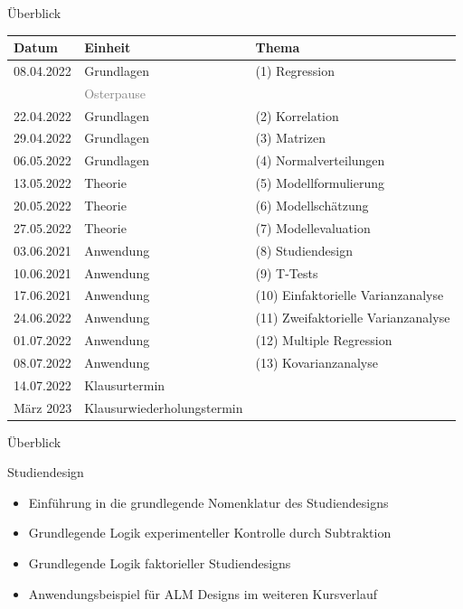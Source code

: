 \documentclass[
  8pt,
  ignorenonframetext,
]{beamer}
\begin{document}
\begin{frame}{Überblick}
\protect\hypertarget{uxfcberblick}{}
\small
\center
\footnotesize
\renewcommand{\arraystretch}{1.1}
\begin{tabular}{lll}
Datum        & Einheit                       & Thema                                              \\\hline
08.04.2022   & Grundlagen                    & (1) Regression                                 \\
             & \textcolor{gray}{Osterpause}                                             \\
22.04.2022   & Grundlagen                    & (2) Korrelation                            \\
29.04.2022   & Grundlagen                    & (3) Matrizen                             \\
06.05.2022   & Grundlagen                    & (4) Normalverteilungen                   \\
13.05.2022   & Theorie                       & (5) Modellformulierung                   \\
20.05.2022   & Theorie                       & (6) Modellschätzung                      \\
27.05.2022   & Theorie                       & (7) Modellevaluation                     \\
03.06.2021   & Anwendung                     & (8) Studiendesign                        \\
10.06.2021   & Anwendung                     & (9) T-Tests                              \\
17.06.2021   & Anwendung                     & (10) Einfaktorielle Varianzanalyse       \\
24.06.2022   & Anwendung                     & (11) Zweifaktorielle Varianzanalyse      \\
01.07.2022   & Anwendung                     & (12) Multiple Regression                 \\
08.07.2022   & Anwendung                     & (13) Kovarianzanalyse                    \\\hline
14.07.2022   & Klausurtermin                 &                                          \\
März 2023    & Klausurwiederholungstermin    &
\end{tabular}
\end{frame}

\begin{frame}{Überblick}
\protect\hypertarget{uxfcberblick-1}{}

Studiendesign

\begin{itemize}
\item
  Einführung in die grundlegende Nomenklatur des Studiendesigns
\item
  Grundlegende Logik experimenteller Kontrolle durch Subtraktion
\item
  Grundlegende Logik faktorieller Studiendesigns
\item
  Anwendungsbeispiel für ALM Designs im weiteren Kursverlauf
\end{itemize}
\end{frame}
\end{document}
